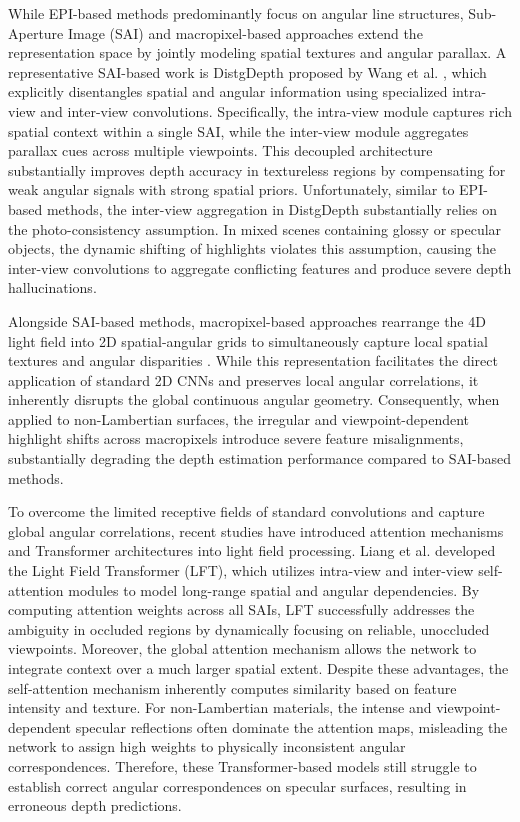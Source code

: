 \documentclass[lettersize,journal]{IEEEtran}
\begin{document}
While EPI-based methods predominantly focus on angular line structures, Sub-Aperture Image (SAI) and macropixel-based approaches extend the representation space by jointly modeling spatial textures and angular parallax. A representative SAI-based work is DistgDepth proposed by Wang et al. \cite{wang2019dingd}, which explicitly disentangles spatial and angular information using specialized intra-view and inter-view convolutions. Specifically, the intra-view module captures rich spatial context within a single SAI, while the inter-view module aggregates parallax cues across multiple viewpoints. This decoupled architecture substantially improves depth accuracy in textureless regions by compensating for weak angular signals with strong spatial priors. Unfortunately, similar to EPI-based methods, the inter-view aggregation in DistgDepth substantially relies on the photo-consistency assumption. In mixed scenes containing glossy or specular objects, the dynamic shifting of highlights violates this assumption, causing the inter-view convolutions to aggregate conflicting features and produce severe depth hallucinations.

Alongside SAI-based methods, macropixel-based approaches rearrange the 4D light field into 2D spatial-angular grids to simultaneously capture local spatial textures and angular disparities \cite{macropixel}. While this representation facilitates the direct application of standard 2D CNNs and preserves local angular correlations, it inherently disrupts the global continuous angular geometry. Consequently, when applied to non-Lambertian surfaces, the irregular and viewpoint-dependent highlight shifts across macropixels introduce severe feature misalignments, substantially degrading the depth estimation performance compared to SAI-based methods.

To overcome the limited receptive fields of standard convolutions and capture global angular correlations, recent studies have introduced attention mechanisms and Transformer architectures into light field processing. Liang et al. \cite{liangliang} developed the Light Field Transformer (LFT), which utilizes intra-view and inter-view self-attention modules to model long-range spatial and angular dependencies. By computing attention weights across all SAIs, LFT successfully addresses the ambiguity in occluded regions by dynamically focusing on reliable, unoccluded viewpoints. Moreover, the global attention mechanism allows the network to integrate context over a much larger spatial extent. Despite these advantages, the self-attention mechanism inherently computes similarity based on feature intensity and texture. For non-Lambertian materials, the intense and viewpoint-dependent specular reflections often dominate the attention maps, misleading the network to assign high weights to physically inconsistent angular correspondences. Therefore, these Transformer-based models still struggle to establish correct angular correspondences on specular surfaces, resulting in erroneous depth predictions.
\end{document}
